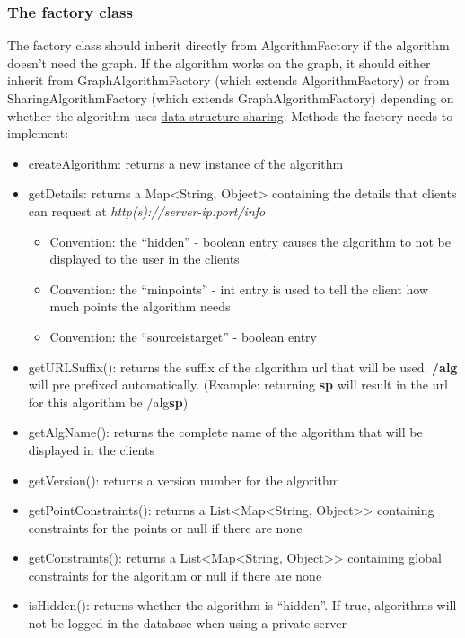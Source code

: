 \documentclass[ngerman,titlepage,parskip=true]{scrartcl}
\begin{document}
	 \subsubsection{The factory class}
	 The factory class should inherit directly from AlgorithmFactory if the algorithm doesn't need the graph. If the algorithm works on the graph, it should either inherit from GraphAlgorithmFactory (which extends AlgorithmFactory) or from SharingAlgorithmFactory (which extends GraphAlgorithmFactory) depending on whether the algorithm uses \hyperref[sharing]{data structure sharing}.
	 Methods the factory needs to implement:
	 \begin{itemize}
	   \item createAlgorithm: returns a new instance of the algorithm
	   \item getDetails: returns a Map<String, Object> containing the details that clients can request at \textit{http(s)://server-ip:port/info}
	   \begin{itemize}
	     \item Convention: the ``hidden'' - boolean entry causes the algorithm to not be displayed to the user in the clients
	     \item Convention: the ``minpoints'' - int entry is used to tell the client how much points the algorithm needs
	     \item Convention: the ``sourceistarget'' - boolean entry 
	   \end{itemize}
		\item getURLSuffix(): returns the suffix of the algorithm url that will be used. \textbf{/alg} will pre prefixed automatically. (Example: returning \textbf{sp} will result in the url for this algorithm be /alg\textbf{sp})
		\item getAlgName(): returns the complete name of the algorithm that will be displayed in the clients
		\item getVersion(): returns a version number for the algorithm
		\item getPointConstraints(): returns a List<Map<String, Object>> containing constraints for the points or null if there are none
		\item getConstraints(): returns a List<Map<String, Object>> containing global constraints for the algorithm or null if there are none
		\item isHidden(): returns whether the algorithm is ``hidden''. If true, algorithms will not be logged in the database when using a private server
	 \end{itemize}
	 
\end{document}
